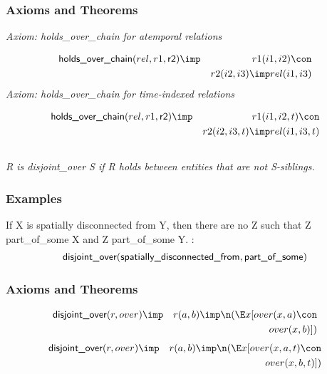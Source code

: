 \subsubsection{Axioms and Theorems}


\emph{Axiom: holds\_over\_chain for atemporal relations}

\begin{eqnarray*}
 \pr{holds\_over\_chain}(rel, r1,  \pr{r2}) &\imp &r1(i1, i2) \con \\
&&r2(i2, i3) \imp rel(i1, i3) 
\end{eqnarray*}
\emph{Axiom: holds\_over\_chain for time-indexed relations}

\begin{eqnarray*}
 \pr{holds\_over\_chain}(rel, r1,  \pr{r2}) &\imp &r1(i1, i2, t) \con \\
&&r2(i2, i3, t) \imp rel(i1, i3, t) 
\end{eqnarray*}

\subsection{ }
\emph{R is disjoint\_over S if R holds between entities that are not S-siblings.}

\subsubsection{Examples}
\begin{clist}
\item If X is spatially disconnected from Y, then there are no Z such that Z part\_of\_some X and Z part\_of\_some Y. : \begin{eqnarray*}
 \mbox{\sf disjoint\_over}( \mbox{\sf spatially\_disconnected\_from},  \mbox{\sf part\_of\_some}) 
\end{eqnarray*}

\end{clist}

\subsubsection{Axioms and Theorems}


\begin{eqnarray*}
 \pr{disjoint\_over}(r, over) &\imp &r(a, b) \imp  \n( \E x[over(x, a) \con \\
&&over(x, b) ])
\end{eqnarray*}
\begin{eqnarray*}
 \pr{disjoint\_over}(r, over) &\imp &r(a, b) \imp  \n( \E x[over(x, a, t) \con \\
&&over(x, b, t) ])
\end{eqnarray*}

